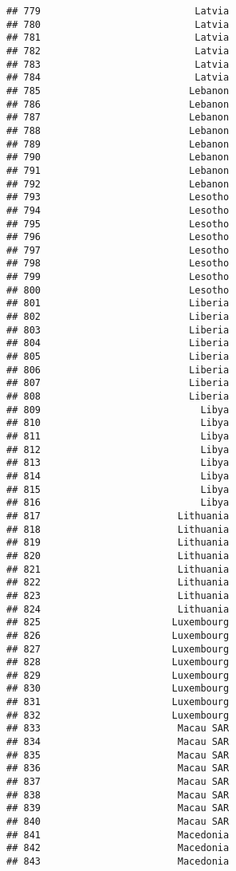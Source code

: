 \documentclass[]{article}
\begin{document}
\begin{verbatim}
## 779                           Latvia
## 780                           Latvia
## 781                           Latvia
## 782                           Latvia
## 783                           Latvia
## 784                           Latvia
## 785                          Lebanon
## 786                          Lebanon
## 787                          Lebanon
## 788                          Lebanon
## 789                          Lebanon
## 790                          Lebanon
## 791                          Lebanon
## 792                          Lebanon
## 793                          Lesotho
## 794                          Lesotho
## 795                          Lesotho
## 796                          Lesotho
## 797                          Lesotho
## 798                          Lesotho
## 799                          Lesotho
## 800                          Lesotho
## 801                          Liberia
## 802                          Liberia
## 803                          Liberia
## 804                          Liberia
## 805                          Liberia
## 806                          Liberia
## 807                          Liberia
## 808                          Liberia
## 809                            Libya
## 810                            Libya
## 811                            Libya
## 812                            Libya
## 813                            Libya
## 814                            Libya
## 815                            Libya
## 816                            Libya
## 817                        Lithuania
## 818                        Lithuania
## 819                        Lithuania
## 820                        Lithuania
## 821                        Lithuania
## 822                        Lithuania
## 823                        Lithuania
## 824                        Lithuania
## 825                       Luxembourg
## 826                       Luxembourg
## 827                       Luxembourg
## 828                       Luxembourg
## 829                       Luxembourg
## 830                       Luxembourg
## 831                       Luxembourg
## 832                       Luxembourg
## 833                        Macau SAR
## 834                        Macau SAR
## 835                        Macau SAR
## 836                        Macau SAR
## 837                        Macau SAR
## 838                        Macau SAR
## 839                        Macau SAR
## 840                        Macau SAR
## 841                        Macedonia
## 842                        Macedonia
## 843                        Macedonia

\end{verbatim}
\end{document}
